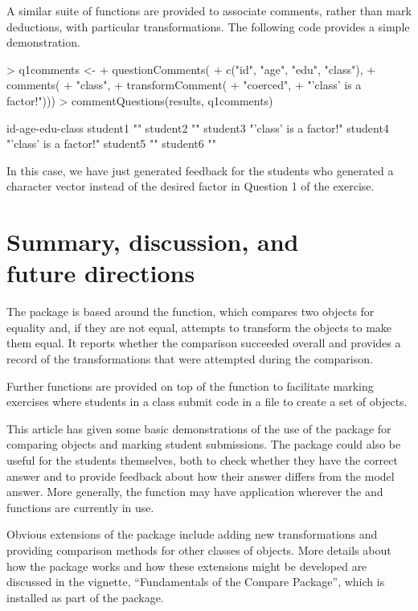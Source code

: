 A similar suite of functions are provided to associate comments,
rather than mark deductions, with  
particular transformations.  The following code provides
 a simple demonstration.

\begin{Schunk}
\begin{Sinput}
> q1comments <-
+     questionComments(
+         c("id", "age", "edu", "class"),
+         comments(
+             "class",
+             transformComment(
+                 "coerced",
+                 "'class' is a factor!")))
> commentQuestions(results, q1comments)
\end{Sinput}
\begin{Soutput}
         id-age-edu-class      
student1 ""                    
student2 ""                    
student3 "'class' is a factor!"
student4 "'class' is a factor!"
student5 ""                    
student6 ""                    
\end{Soutput}
\end{Schunk}
In  this case, we have just generated feedback for the students
who generated a character vector instead of the desired factor
in Question 1 of the exercise.

\section*{Summary, discussion, and\\future directions}

The  package is based around the  
function, which compares two objects for equality and, if they
are not equal, attempts
to transform the objects to make them equal.  It reports whether 
the comparison succeeded overall and provides a record of 
the transformations that were
attempted during the comparison.

Further functions are provided on top of the  
function to facilitate marking exercises where students in a class
submit \R{} code in a file to create a set of \R{} objects.

This article has given some basic demonstrations of the use of 
the  package for comparing objects and marking 
student submissions.  The package could also be useful for the
students themselves, both to check whether they have the correct 
answer and to provide feedback about how their answer differs 
from the model answer.  More generally, the 
function may have application wherever the 
and  functions are currently in use.

Obvious extensions of the  package include adding
new transformations and providing comparison 
methods for other classes of objects.  
More details about how the package works and how these 
extensions might be developed are discussed in
the vignette, ``Fundamentals of the Compare Package'',
which is installed as part of the  package.



